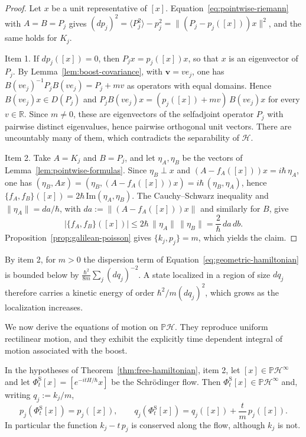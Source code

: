 \begin{proof}
	Let $x$ be a unit representative of $[x]$. Equation~\eqref{eq:pointwise-riemann} with $A=B=P_j$ gives $(d p_j)^2=\langle P_j^2\rangle-p_j^2=\|(P_j-p_j([x]))x\|^2$, and the same holds for $K_j$.
	
	Item 1. If $d p_j([x])=0$, then $P_jx=p_j([x])x$, so that $x$ is an eigenvector of $P_j$. By Lemma~\ref{lem:boost-covariance}, with $\mathbf{v}=ve_j$, one has $B(ve_j)^{-1}P_jB(ve_j)=P_j+mv$ as operators with equal domains. Hence $B(ve_j)x\in D(P_j)$ and $P_jB(ve_j)x=(p_j([x])+mv)\,B(ve_j)x$ for every $v\in\mathbb{R}$. Since $m\neq0$, these are eigenvectors of the selfadjoint operator $P_j$ with pairwise distinct eigenvalues, hence pairwise orthogonal unit vectors. There are uncountably many of them, which contradicts the separability of $\mathcal{H}$.
	
	Item 2. Take $A=K_j$ and $B=P_j$, and let $\eta_A,\eta_B$ be the vectors of Lemma~\ref{lem:pointwise-formulas}. Since $\eta_B\perp x$ and $(A-f_A([x]))x=i\hbar\,\eta_A$, one has $(\eta_B,Ax)=(\eta_B,(A-f_A([x]))x)=i\hbar\,(\eta_B,\eta_A)$, hence $\{f_A,f_B\}([x])=2\hbar\,\mathrm{Im}(\eta_A,\eta_B)$. The Cauchy--Schwarz inequality and $\|\eta_A\|=d a/\hbar$, with $d a:=\|(A-f_A([x]))x\|$ and similarly for $B$, give
	\begin{equation*}
		|\{f_A,f_B\}([x])|\le2\hbar\,\|\eta_A\|\,\|\eta_B\|=\frac{2}{\hbar}\,d a\,d b.
	\end{equation*}
	Proposition~\ref{prop:galilean-poisson} gives $\{k_j,p_j\}=m$, which yields the claim.
\end{proof}

\noindent By item 2, for $m>0$ the dispersion term of Equation~\eqref{eq:geometric-hamiltonian} is bounded below by $\frac{\hbar^2}{8m}\sum_j(d q_j)^{-2}$. A state localized in a region of size $d q_j$ therefore carries a kinetic energy of order $\hbar^2/m(d q_j)^2$, which grows as the localization increases.

We now derive the equations of motion on $\mathbb{P}\mathcal{H}$. They reproduce uniform rectilinear motion, and they exhibit the explicitly time dependent integral of motion associated with the boost.

\begin{corollary}\label{cor:uniform-motion}
	In the hypotheses of Theorem~\ref{thm:free-hamiltonian}, item 2, let $[x]\in\mathbb{P}\mathcal{H}^\infty$ and let $\Phi^{\mathrm{S}}_t[x]=[e^{-itH/\hbar}x]$ be the Schrödinger flow. Then $\Phi^{\mathrm{S}}_t[x]\in\mathbb{P}\mathcal{H}^\infty$ and, writing $q_j:=k_j/m$,
	\begin{equation}
		p_j(\Phi^{\mathrm{S}}_t[x])=p_j([x]),\qquad q_j(\Phi^{\mathrm{S}}_t[x])=q_j([x])+\frac{t}{m}\,p_j([x]).
	\end{equation}
	In particular the function $k_j-t\,p_j$ is conserved along the flow, although $k_j$ is not.
\end{corollary}

